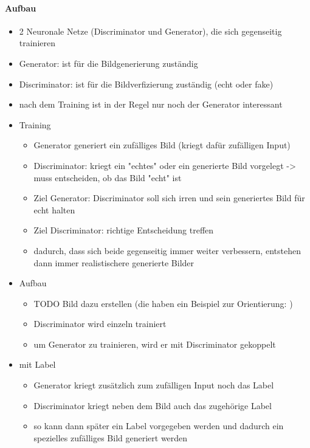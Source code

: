\paragraph{Aufbau \cite{gan-original-paper, hyperparameters-gan-using-genetic-algorithm}}
\begin{itemize}
	\item 2 Neuronale Netze (Discriminator und Generator), die sich gegenseitig trainieren
	\item Generator: ist für die Bildgenerierung zuständig
	\item Discriminator: ist für die Bildverfizierung zuständig (echt oder fake)
	\item nach dem Training ist in der Regel nur noch der Generator interessant
	
	\item Training
	\begin{itemize}
		\item Generator generiert ein zufälliges Bild (kriegt dafür zufälligen Input)
		\item Discriminator: kriegt ein "echtes" oder ein generierte Bild vorgelegt -> muss entscheiden, ob das Bild "echt" ist
		\item Ziel Generator: Discriminator soll sich irren und sein generiertes Bild für echt halten
		\item Ziel Discriminator: richtige Entscheidung treffen
		\item dadurch, dass sich beide gegenseitig immer weiter verbessern, entstehen dann immer realistischere generierte Bilder
	\end{itemize}

	\item Aufbau
	\begin{itemize}
		\item TODO Bild dazu erstellen (die haben ein Beispiel zur Orientierung: \cite{hyperparameters-gan-using-genetic-algorithm})
		\item Discriminator wird einzeln trainiert
		\item um Generator zu trainieren, wird er mit Discriminator gekoppelt
	\end{itemize}

	\item mit Label
	\begin{itemize}
		\item Generator kriegt zusätzlich zum zufälligen Input noch das Label
		\item Discriminator kriegt neben dem Bild auch das zugehörige Label
		\item so kann dann später ein Label vorgegeben werden und dadurch ein spezielles zufälliges Bild generiert werden
	\end{itemize}
\end{itemize}


